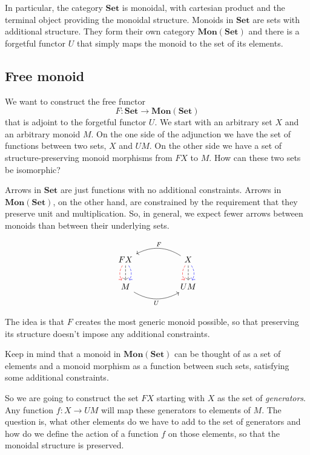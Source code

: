 \documentclass[DaoFP]{subfiles}
\begin{document}
In particular, the category $\mathbf{Set}$ is monoidal, with cartesian product and the terminal object providing the monoidal structure. Monoids in $\mathbf{Set}$ are sets with additional structure. They form their own category $\mathbf{Mon}(\mathbf{Set})$ and there is a forgetful functor $U$ that simply maps the monoid to the set of its elements.

\subsection{Free monoid}

We want to construct the free functor 
\[ F \colon \mathbf{Set} \to \mathbf{Mon}(\mathbf{Set})\]
that is adjoint to the forgetful functor $U$. We start with an arbitrary set $X$ and an arbitrary monoid $M$. On the one side of the adjunction we have the set of functions between two sets, $X$ and $U M$. On the other side we have a set of structure-preserving monoid morphisms from $F X$ to $M$. How can these two sets be isomorphic?

Arrows in $\mathbf{Set}$ are just functions with no additional constraints. Arrows in $\mathbf{Mon}(\mathbf{Set})$, on the other hand, are constrained by the requirement that they preserve unit and multiplication. So, in general, we expect fewer arrows between monoids than between their underlying sets. 

\[
 \begin{tikzcd}
F X
\arrow[d, bend right, red, dashed]
\arrow[d, dashed]
\arrow[d, bend left, blue, dashed]
  &&
  X
\arrow[d, bend right, red, dashed]
\arrow[d, dashed]
\arrow[d, bend left, blue, dashed]
 \arrow[ll, bend right, "F"']
 \\
M
   \arrow[rr, bend right, "U"']
 &&
 U M
  \end{tikzcd}
\]

The idea is that $F$ creates the most generic monoid possible, so that preserving its structure doesn't impose any additional constraints. 

Keep in mind that a monoid in  $\mathbf{Mon}(\mathbf{Set})$ can be thought of as a set of elements and a monoid morphism as a function between such sets, satisfying some additional constraints. 

So we are going to construct the set $F X$ starting with $X$ as the set of \emph{generators}.  Any function $f \colon X \to U M$ will map these generators to elements of $M$. The question is, what other elements do we have to add to the set of generators and how do we define the action of a function $f$ on those elements, so that the monoidal structure is preserved. 
\end{document}
